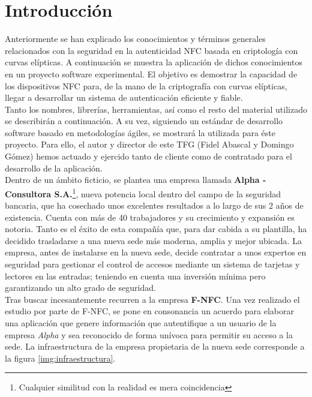 \documentclass[../PFC.tex]{subfiles}
\begin{document}
\vspace{0.5515cm}

\section{Introducción}
\label{App:Introducción}

Anteriormente se han explicado los conocimientos y términos generales relacionados con la seguridad en la autenticidad NFC basada en criptología con curvas elípticas. A continuación se muestra la aplicación de dichos conocimientos en un proyecto software experimental. El objetivo es demostrar la capacidad de los dispositivos NFC para, de la mano de la criptografía con curvas elípticas, llegar a desarrollar un sistema de autenticación eficiente y fiable.
\*
\vspace{0.5515cm}
\\
Tanto los nombres, librerías, herramientas, así como el resto del material utilizado se describirán a continuación. A su vez, siguiendo un estándar de desarrollo software basado en metodologías ágiles, se mostrará la utilizada para éste proyecto. Para ello,  el autor y director de este TFG (Fidel Abascal y Domingo Gómez) hemos actuado y ejercido tanto de cliente como de contratado para el desarrollo de la aplicación. 
\*
\vspace{0.5515cm}
\\
Dentro de un ámbito ficticio, se plantea una empresa llamada \textbf{Alpha - Consultora S.A.}\footnote{Cualquier similitud con la realidad es mera coincidencia}, nueva potencia local dentro del campo de la seguridad bancaria, que ha cosechado unos excelentes resultados a lo largo de sus 2 años de existencia. Cuenta con más de 40 trabajadores y su crecimiento y expansión es notoria. Tanto es el éxito de esta compañía que, para dar cabida a su plantilla, ha decidido trasladarse a una nueva sede más moderna, amplia y mejor ubicada. La empresa, antes de instalarse en la nueva sede, decide contratar a unos expertos en seguridad para gestionar el control de accesos mediante un sistema de tarjetas y lectores en las entradas; teniendo en cuenta una inversión mínima pero garantizando un alto grado de seguridad.
\*
\vspace{0.5515cm}
\\
Tras buscar incesantemente recurren a la empresa \textbf{F-NFC}. Una vez realizado el estudio por parte de F-NFC, se pone en consonancia un acuerdo para elaborar una aplicación que genere información que autentifique a un usuario de la empresa \textit{Alpha} y sea reconocido de forma unívoca para permitir su acceso a la sede. La infraestructura de la empresa propietaria de la nueva sede corresponde a la figura \ref{img:infraestructura}.
\end{document}
